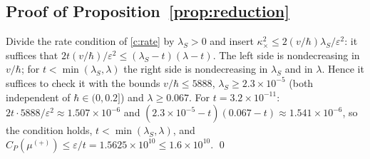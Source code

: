 \documentclass[11pt,a4paper]{article}
\theoremstyle{definition}
\theoremstyle{remark}
\begin{document}
\subsection{Proof of Proposition~\ref{prop:reduction}}\label{app:prop}
Divide the rate condition of \ref{c:rate} by $\lambda_S>0$ and insert $\kappa_\times^2\le2(v/\hbar)\lambda_S/\varepsilon^2$: it suffices that $2t(v/\hbar)/\varepsilon^2\le(\lambda_S-t)(\lambda-t)$. The left side is nondecreasing in $v/\hbar$; for $t<\min(\lambda_S,\lambda)$ the right side is nondecreasing in $\lambda_S$ and in $\lambda$. Hence it suffices to check it with the bounds $v/\hbar\le5888$, $\lambda_S\ge2.3\times10^{-5}$ (both independent of $\hbar\in(0,0.2]$) and $\lambda\ge0.067$. For $t=3.2\times10^{-11}$: $2t\cdot5888/\varepsilon^2\approx1.507\times10^{-6}$ and $(2.3\times10^{-5}-t)(0.067-t)\approx1.541\times10^{-6}$, so the condition holds, $t<\min(\lambda_S,\lambda)$, and $C_P(\mu^{(+)})\le\varepsilon/t=1.5625\times10^{10}\le1.6\times10^{10}$. \qed
\end{document}
